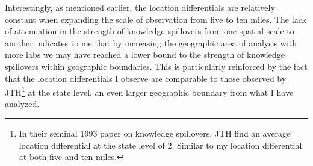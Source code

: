 \documentclass[12pt,letterpaper]{article}
\begin{document}
Interestingly, as mentioned earlier, the location differentials are relatively constant when expanding the scale of observation from five to ten miles. The lack of attenuation in the strength of knowledge spillovers from one spatial scale to another indicates to me that by increasing the geographic area of analysis with more labs we may have reached a lower bound to the strength of knowledge spillovers within geographic boundaries. This is particularly reinforced by the fact that the location differentials I observe are comparable to those observed by JTH\footnote{In their seminal 1993 paper on knowledge spillovers, JTH find an average location differential at the state level of 2. Similar to my location differential at both five and ten miles.} at the state level, an even larger geographic boundary from what I have analyzed.  
\end{document}
